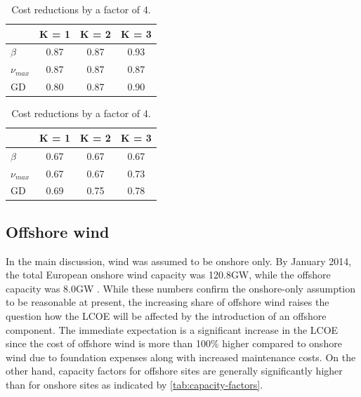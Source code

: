 \documentclass[a4paper, 5p, sort&compress]{elsarticle}%
\begin{document}
\begin{table}[h!]
  \centering
  \caption{Alpha values for optimal layouts for different scalings of
    the solar cost.}
  \label{tab:solar-alpha}
  \begin{subtable}{\columnwidth}
    \centering
    \caption{Cost reductions by a factor of 2.} 
    \begin{tabular}[h!]{l c c c}\toprule
      & K = 1 & K = 2 & K = 3 \\ \midrule
      $\beta$ & 0.87 & 0.87 & 0.93 \\ 
      $\nu_{max}$ & 0.87 & 0.87 & 0.87 \\ 
      GD & 0.80 & 0.87 & 0.90 \\ \bottomrule
    \end{tabular}
    \vspace{10pt}
  \end{subtable}
  \begin{subtable}{\columnwidth}
    \centering
    \caption{Cost reductions by a factor of 4.} 
  \begin{tabular}[h!]{l c c c}\toprule
    & K = 1 & K = 2 & K = 3 \\ \midrule
    $\beta$ & 0.67 & 0.67 & 0.67 \\ 
    $\nu_{max}$ & 0.67 & 0.67 & 0.73 \\ 
    GD & 0.69 & 0.75 & 0.78 \\ \bottomrule
  \end{tabular}
\end{subtable}
\end{table}

\subsection{Offshore wind}
\label{sec:offshore-wind}

In the main discussion, wind was assumed to be onshore only. By
January 2014, the total European onshore wind capacity was 120.8GW,
while the offshore capacity was 8.0GW \cite{EWEA}. While these numbers
confirm the onshore-only assumption to be reasonable at present, the
increasing share of offshore wind raises the question how the LCOE
will be affected by the introduction of an offshore component. The
immediate expectation is a significant increase in the LCOE since the
cost of offshore wind is more than 100\% higher compared to onshore
wind due to foundation expenses along with increased maintenance
costs. On the other hand, capacity factors for offshore sites are
generally significantly higher than for onshore sites as indicated by
\cref{tab:capacity-factors}.
\end{document}
